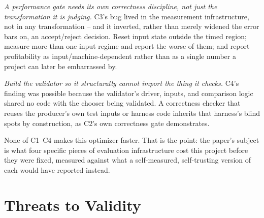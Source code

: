 \documentclass[sigconf,review,anonymous]{acmart}
\begin{document}
\emph{A performance gate needs its own correctness discipline, not just the
transformation it is judging.} C3's bug lived in the measurement
infrastructure, not in any transformation -- and it inverted, rather than
merely widened the error bars on, an accept/reject decision. Reset input
state outside the timed region; measure more than one input regime and
report the worse of them; and report profitability as
input/machine-dependent rather than as a single number a project can later
be embarrassed by.

\emph{Build the validator so it structurally cannot import the thing it
checks.} C4's finding was possible because the validator's driver, inputs,
and comparison logic shared no code with the chooser being validated. A
correctness checker that reuses the producer's own test inputs or harness
code inherits that harness's blind spots by construction, as C2's own
correctness gate demonstrates.

None of C1--C4 makes this optimizer faster. That is the point: the paper's
subject is what four specific pieces of evaluation infrastructure cost this
project before they were fixed, measured against what a self-measured,
self-trusting version of each would have reported instead.

\section{Threats to Validity}
\label{sec:threats}
\end{document}

